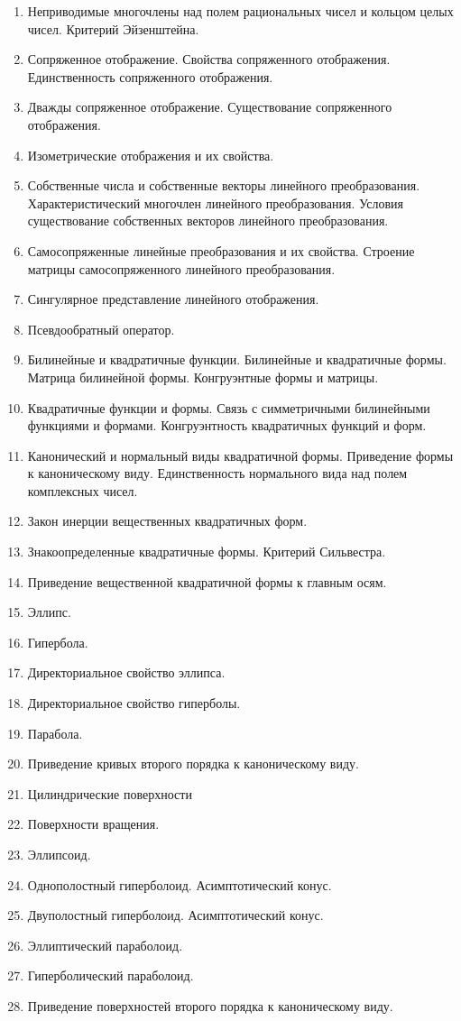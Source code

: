 \documentclass[a4paper]{article}
\begin{document}
\begin{enumerate}
\item Неприводимые многочлены над полем рациональных чисел и кольцом целых чисел. Критерий Эйзенштейна.
\item Сопряженное отображение. Свойства сопряженного отображения. Единственность сопряженного отображения. 
\item Дважды сопряженное отображение. Существование сопряженного отображения.
\item Изометрические отображения и их свойства.
\item Собственные числа и собственные векторы линейного преобразования. Характеристический многочлен линейного преобразования. Условия существование собственных векторов линейного преобразования.
\item Самосопряженные линейные преобразования и их свойства. Строение матрицы самосопряженного линейного преобразования.
\item Сингулярное представление линейного отображения.
\item Псевдообратный оператор.
\item Билинейные и квадратичные функции. Билинейные и квадратичные формы. Матрица билинейной формы. Конгруэнтные формы и матрицы. 
\item Квадратичные функции и формы. Связь с симметричными билинейными функциями и формами. Конгруэнтность квадратичных функций и форм.
\item Канонический и нормальный виды квадратичной формы. Приведение формы к каноническому виду. Единственность нормального вида над полем комплексных чисел. 
\item Закон инерции вещественных квадратичных форм. 
\item Знакоопределенные квадратичные формы. Критерий Сильвестра. 
\item Приведение вещественной квадратичной формы к главным осям. 
\item Эллипс.
\item Гипербола.
\item Директориальное свойство эллипса.
\item Директориальное свойство гиперболы.
\item Парабола.
\item Приведение кривых второго порядка к каноническому виду.
\item Цилиндрические поверхности
\item Поверхности вращения.
\item Эллипсоид.
\item Однополостный гиперболоид. Асимптотический конус.
\item Двуполостный гиперболоид. Асимптотический конус.
\item Эллиптический параболоид.
\item Гиперболический параболоид.
\item Приведение поверхностей второго порядка к каноническому виду.
\end{enumerate}
\end{document}

